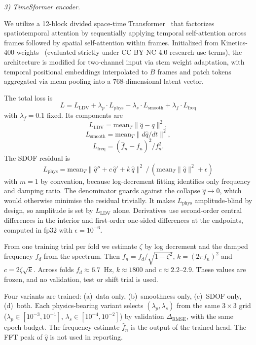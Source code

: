 \documentclass[conference]{IEEEtran}
\begin{document}
\noindent\textit{3) TimeSformer encoder.}

We utilize a 12-block divided space-time Transformer~\cite{Bertasius2021} that factorizes spatiotemporal attention by sequentially applying temporal self-attention across frames followed by spatial self-attention within frames. Initialized from Kinetics-400 weights~\cite{Kay2017} (evaluated strictly under CC BY-NC 4.0 research-use terms), the architecture is modified for two-channel input via stem weight adaptation, with temporal positional embeddings interpolated to $B$ frames and patch tokens aggregated via mean pooling into a $768$-dimensional latent vector.

The total loss is
\begin{equation}
L = L_{\mathrm{LDV}} + \lambda_p \cdot L_{\mathrm{phys}} + \lambda_s \cdot L_{\mathrm{smooth}} + \lambda_f \cdot L_{\mathrm{freq}} \label{eq:loss}
\end{equation}
with $\lambda_f = 0.1$ fixed. Its components are
\[
L_{\mathrm{LDV}} = \mathrm{mean}_T \lVert \hat{q} - q \rVert^2,
\]
\[
L_{\mathrm{smooth}} = \mathrm{mean}_T \lVert d\hat{q}/dt \rVert^2,
\]
\[
L_{\mathrm{freq}} = (\hat{f}_n - f_n)^2/f_n^2.
\]
The SDOF residual is
\begin{equation}
L_{\mathrm{phys}} = \mathrm{mean}_T \lVert \hat{q}'' + c\,\hat{q}' + k\,\hat{q} \rVert^2 \,/\, (\mathrm{mean}_T \lVert \hat{q} \rVert^2 + \epsilon) \label{eq:lphys}
\end{equation}
with $m = 1$ by convention, because log-decrement fitting identifies only frequency and damping ratio. The denominator guards against the collapse $\hat{q} \to 0$, which would otherwise minimise the residual trivially. It makes $L_{\mathrm{phys}}$ amplitude-blind by design, so amplitude is set by $L_{\mathrm{LDV}}$ alone. Derivatives use second-order central differences in the interior and first-order one-sided differences at the endpoints, computed in fp32 with $\epsilon = 10^{-6}$.

From one training trial per fold we estimate $\zeta$ by log decrement and the damped frequency $f_d$ from the spectrum. Then $f_n = f_d/\sqrt{1 - \zeta^2}$, $k = (2\pi f_n)^2$ and $c = 2\zeta\sqrt{k}$. Across folds $f_d \approx 6.7$~Hz, $k \approx 1800$ and $c \approx 2.2$--$2.9$. These values are frozen, and no validation, test or shift trial is used.

Four variants are trained: (a)~data only, (b)~smoothness only, (c)~SDOF only, (d)~both. Each physics-bearing variant selects $(\lambda_p, \lambda_s)$ from the same $3\times3$ grid ($\lambda_p \in [10^{-3}, 10^{-1}]$, $\lambda_s \in [10^{-4}, 10^{-2}]$) by validation $\Delta_{\mathrm{RMSE}}$, with the same epoch budget. The frequency estimate $\hat{f}_n$ is the output of the trained head. The FFT peak of $\hat{q}$ is not used in reporting.
\end{document}

